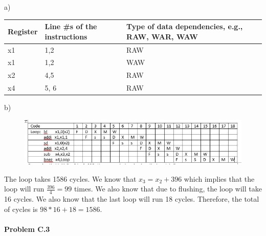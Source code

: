 \documentclass[11pt]{article}
\begin{document}
\begin{flushleft}
    a)
    \newline
    \begin{center}
    \begin{tabular}{ | m{10em} | m{10em}| m{10em} | } 
        \hline
        Register & Line \#s of the instructions & Type of data dependencies, e.g., RAW, WAR, WAW \\ 
        \hline
        x1 & 1,2 & RAW \\ 
        \hline
        x1 & 1,2 & WAW \\ 
        \hline
        x2 & 4,5   & RAW \\
        \hline
        x4 & 5, 6 & RAW \\
        \hline
    \end{tabular}
    \end{center}

    b)
    \newline

    \begin{figure}[htbp]
        \centerline{\includegraphics[scale=1]{Capture.JPG}}
        \label{fig}
    \end{figure}

    The loop takes 1586 cycles. 
    \newline
    We know that $x_3 = x_2 + 396$ which implies that the loop will run $\frac{396}{4} = 99$ times. We also know that due to flushing, the loop will take 16 cycles. We also know that the last loop will run 18 cycles.
    Therefore, the total of cycles is $98*16 + 18 = 1586$.
\end{flushleft}   

\paragraph{\noindent\textbf{\LARGE{Problem C.3}}}

\end{document}
